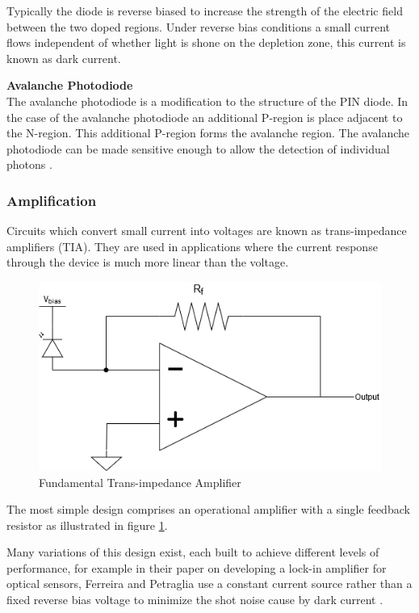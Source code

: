 Typically the diode is reverse biased to increase the strength of the electric field between the two doped regions. Under reverse bias conditions a small current flows independent of whether light is shone on the depletion zone, this current is known as dark current.

\textbf{Avalanche Photodiode}\\
The avalanche photodiode is a modification to the structure of the PIN diode. In the case of the avalanche photodiode an additional P-region is place adjacent to the N-region. This additional P-region forms the avalanche region. The avalanche photodiode can be made sensitive enough to allow the detection of individual photons \cite{Perenzoni2018}.


\subsubsection{Amplification}

Circuits which convert small current into voltages are known as trans-impedance amplifiers (TIA). They are used in applications where the current response through the device is much more linear than the voltage.

\begin{figure}[H]
	\centering
	\includegraphics[width=0.6\linewidth]{figures/litreview/transimpedance_amplifier.png}
	\caption{Fundamental Trans-impedance Amplifier}
	\label{fig:transimpedance_amplifier}
\end{figure}

The most simple design comprises an operational amplifier with a single feedback resistor as illustrated in figure \ref{fig:transimpedance_amplifier}.

Many variations of this design exist, each built to achieve different levels of performance, for example in their paper on developing a lock-in amplifier for optical sensors, Ferreira and Petraglia use a constant current source rather than a fixed reverse bias voltage to minimize the shot noise cause by dark current \cite{Ferreira2017}.


